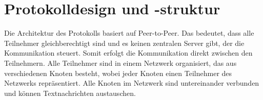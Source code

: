 \section{Protokolldesign und -struktur}
\label{sec:protokolldesign_und_struktur}


Die Architektur des Protokolls basiert auf Peer-to-Peer. Das bedeutet, dass
alle Teilnehmer gleichberechtigt sind und es keinen zentralen Server gibt, der
die Kommunikation steuert. Somit erfolgt die Kommunikation direkt zwischen den
Teilnehmern. Alle Teilnehmer sind in einem Netzwerk organisiert, das aus
verschiedenen Knoten besteht, wobei jeder Knoten einen Teilnehmer des Netzwerks repräsentiert.
Alle Knoten im Netzwerk sind untereinander verbunden und können Textnachrichten austauschen.













%

%

%





